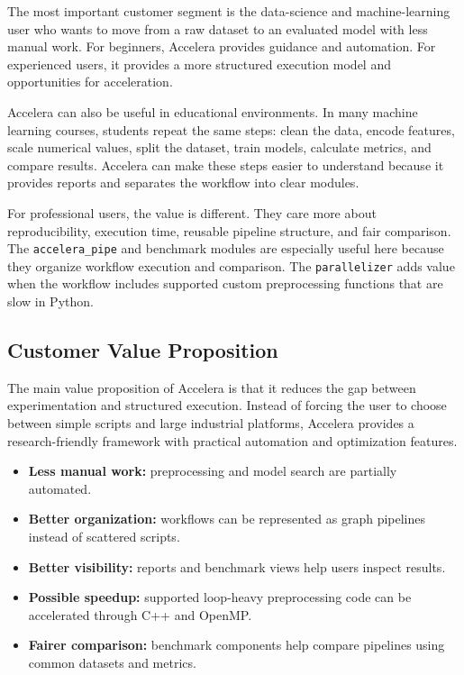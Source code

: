 \documentclass[12pt,a4paper]{report}
\begin{document}
The most important customer segment is the data-science and machine-learning
user who wants to move from a raw dataset to an evaluated model with less manual
work. For beginners, Accelera provides guidance and automation. For experienced
users, it provides a more structured execution model and opportunities for
acceleration.

Accelera can also be useful in educational environments. In many machine
learning courses, students repeat the same steps: clean the data, encode
features, scale numerical values, split the dataset, train models, calculate
metrics, and compare results. Accelera can make these steps easier to understand
because it provides reports and separates the workflow into clear modules.

For professional users, the value is different. They care more about
reproducibility, execution time, reusable pipeline structure, and fair
comparison. The \texttt{accelera\_pipe} and benchmark modules are especially
useful here because they organize workflow execution and comparison. The
\texttt{parallelizer} adds value when the workflow includes supported custom
preprocessing functions that are slow in Python.

\subsection*{Customer Value Proposition}

The main value proposition of Accelera is that it reduces the gap between
experimentation and structured execution. Instead of forcing the user to choose
between simple scripts and large industrial platforms, Accelera provides a
research-friendly framework with practical automation and optimization features.

\begin{itemize}
  \item \textbf{Less manual work:} preprocessing and model search are partially
  automated.
  \item \textbf{Better organization:} workflows can be represented as graph
  pipelines instead of scattered scripts.
  \item \textbf{Better visibility:} reports and benchmark views help users
  inspect results.
  \item \textbf{Possible speedup:} supported loop-heavy preprocessing code can be
  accelerated through C++ and OpenMP.
  \item \textbf{Fairer comparison:} benchmark components help compare pipelines
  using common datasets and metrics.
\end{itemize}
\end{document}
